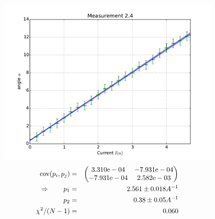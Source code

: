\begin{figure}
    \begin{centering}
        \includegraphics[width=18cm]{figures/fig24}
\captionsetup{singlelinecheck=off} 
\caption[.]{
\begin{eqnarray}
    \mathrm{cov}(p_i, p_j) &=& 
    \begin{pmatrix}
        3.310\mathrm{e}-04 &-7.931\mathrm{e}-04 \\
        -7.931\mathrm{e}-04 &2.582\mathrm{e}-03 \\
    \end{pmatrix}
\\ \Rightarrow \qquad
    p_1 &=& 2.561 \pm 0.018 A^{-1}\\
    p_2 &=& 0.38 \pm 0.05 A^{-1} \\
    \chi ^2/(N-1) &=&  0.060
\end{eqnarray}
}
    \end{centering}
\end{figure}


